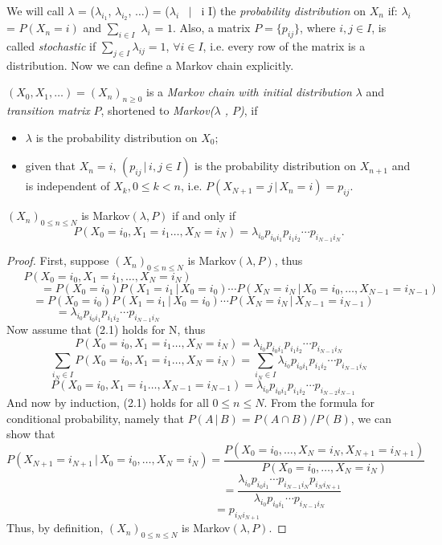 We will call $\lambda$ = ($\lambda_{i_{1}}$, $\lambda_{i_{2}}$, $\ldots$) = ($\lambda_{i}$ \, $|$ \, i \in I) the \emph{probability distribution} on $X_{n}$ if:
\newline
$\lambda_{i}$ = $P(X_{n} = i)$ and $\sum_{i \in I}$ $\lambda_{i}$ = $1$. Also, a matrix $P = \{ p_{ij} \}$, where $i,j \in I$, is called \emph{stochastic} if $\sum_{j \in I} \lambda_{ij} = 1$, $\forall i \in I$, i.e. every row of the matrix is a distribution. Now we can define a Markov chain explicitly.
\newline
\begin{defn}
$(X_0, X_1, \ldots) = (X_n)_{n \geq 0}$ is a \emph{Markov chain with initial distribution} $\lambda$ and \emph{transition matrix} $P$, shortened to \emph{Markov($\lambda$ , $P$)}, if
\begin{itemize}
\item $\lambda$ is the probability distribution on $X_0$;
\item given that $X_n = i$, $(p_{ij} \, | \, i,j \in I)$ is the probability distribution on $X_{n+1}$ and is independent of $X_k, 0 \leq k < n$, i.e. $P(X_{N+1}=j \, | \, X_n=i) = p_{ij}$.
\end{itemize}
\end{defn}
\newline
\begin{thm} $(X_n)_{0 \leq n \leq N}$ is Markov$(\lambda, P)$ if and only if
\begin{equation} P(X_0=i_0, X_1=i_1 \ldots , X_N=i_N) = \lambda_{i_0}p_{i_0i_1}p_{i_1i_2}\cdots p_{i_{N-1}i_N}.
\end{equation}
\end{thm}
\begin{proof} First, suppose $(X_n)_{0 \leq n \leq N}$ is Markov$(\lambda, P)$, thus
\[ P(X_0=i_0,X_1=i_1, \ldots , X_N=i_N) \qquad\qquad\qquad\qquad\qquad\qquad\qquad\qquad\qquad\]
\[ \qquad \quad = P(X_0=i_0)P(X_1=i_1 \, | \, X_0=i_0) \cdots P(X_N=i_N\, | \, X_0=i_0, \ldots, X_{N-1}=i_{N-1})\]
\[ \! = P(X_0=i_0)P(X_1=i_1 \, | \, X_0=i_0) \cdots P(X_N=i_N\, | \, X_{N-1}=i_{N-1})\quad\]
\[\!\!\!\!\!\! = \lambda_{i_0}p_{i_0i_1}p_{i_1i_2}\cdots p_{i_{N-1}i_N} \qquad\qquad\qquad\qquad\qquad\qquad\qquad\qquad\qquad\]
Now assume that (2.1) holds for N, thus
\[P(X_0=i_0, X_1=i_1 \ldots , X_N=i_N) = \lambda_{i_0}p_{i_0i_1}p_{i_1i_2}\cdots p_{i_{N-1}i_N} \]
\[\sum_{i_N \in I} P(X_0=i_0, X_1=i_1 \ldots , X_N=i_N) = \sum_{i_N \in I} \lambda_{i_0}p_{i_0i_1}p_{i_1i_2}\cdots p_{i_{N-1}i_N} \]
\[\!P(X_0=i_0, X_1=i_1 \ldots , X_{N-1}=i_{N-1}) = \lambda_{i_0}p_{i_0i_1}p_{i_1i_2}\cdots p_{i_{N-2}i_{N-1}} \quad\]
And now by induction, (2.1) holds for all $0 \leq n \leq N$. From the formula for conditional probability, namely that $P(A\,|\,B)=P(A \cap B)/P(B)$, we can show that
\[P(X_{N+1}=i_{N+1}\, | \, X_0=i_0, \ldots, X_N=i_N) = \frac{P(X_0=i_0, \ldots ,  X_N=i_N, X_{N+1}=i_{N+1})}{P(X_0=i_0, \ldots , X_N=i_N)} \]
\[\qquad\qquad\qquad\qquad\qquad\qquad\quad\! = \frac{\lambda_{i_0}p_{i_0i_1}\cdots p_{i_{N-1}i_N}p_{i_Ni_{N+1}}}{\lambda_{i_0}p_{i_0i_1}\cdots p_{i_{N-1}i_N}} \]
\[ \qquad\qquad\quad \! \! \! = p_{i_Ni_{N+1}} \]
Thus, by definition, $(X_n)_{0 \leq n \leq N}$ is Markov$(\lambda, P)$.
\end{proof}

